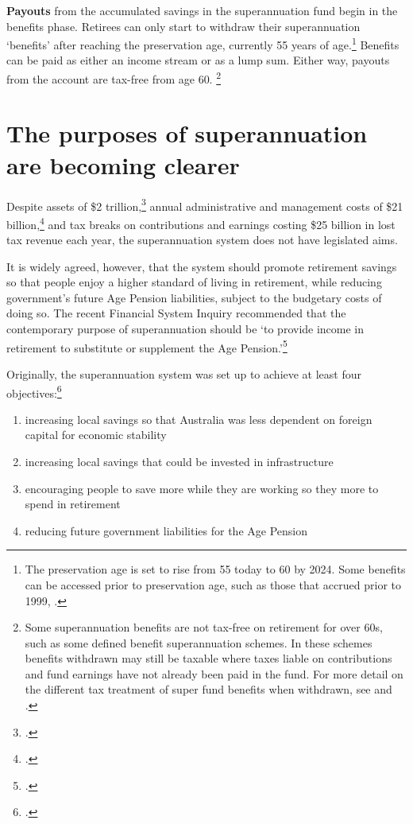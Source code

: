  \textbf{Payouts} from the accumulated savings in the superannuation fund begin in the benefits phase.  Retirees can only start to withdraw their superannuation ‘benefits’ after reaching the preservation age, currently 55 years of age.\footnote{The preservation age is set to rise from 55 today to 60 by 2024. Some benefits can be accessed prior to preservation age, such as those that accrued prior to 1999, \textcite{ATO2015WhenYouCanAccessYourSuper}.} Benefits can be paid as either an income stream or as a lump sum. Either way, payouts from the account are tax-free from age 60.%
 \footnote{Some superannuation benefits are not tax-free on retirement for over 60s, such as some defined benefit superannuation schemes. In these schemes benefits withdrawn may still be taxable where taxes liable on contributions and fund earnings have not already been paid in the fund. For more detail on the different tax treatment of super fund benefits when withdrawn, see \textcite{ATO2015HowTaxAppliesToSuper} and \textcite[][13]{Mercer2015SubmissionToReThink}.}

\FloatBarrier
 \section{The purposes of superannuation are becoming clearer}
 Despite assets of \$2 trillion,\footcite{APRA2015JuneSuperPerformance} annual administrative and management costs of \$21 billion,\footcite{MinifieSavageCameron2015} and tax breaks on contributions and earnings costing \$25 billion in lost tax revenue each year, the superannuation system does not have legislated aims. 

It is widely agreed, however, that the system should promote retirement savings so that people enjoy a higher standard of living in retirement, while reducing government’s future Age Pension liabilities, subject to the budgetary costs of doing so. The recent Financial System Inquiry recommended that the contemporary purpose of superannuation should be ‘to provide income in retirement to substitute or supplement the Age Pension.’\footcite[][95]{FinancialSystemsInquiry2015}

 Originally, the superannuation system was set up to achieve at least four objectives:\footcite{Greenwood2010}
 \begin{enumerate}
\item increasing local savings so that Australia was less dependent on foreign capital for economic stability
\item increasing local savings that could be invested in infrastructure
\item encouraging people to save more while they are working so they more to spend in retirement
\item reducing future government liabilities for the Age Pension
 \end{enumerate}

